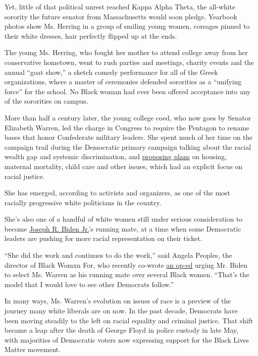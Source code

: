 Yet, little of that political unrest reached Kappa Alpha Theta, the
all-white sorority the future senator from Massachusetts would soon
pledge. Yearbook photos show Ms. Herring in a group of smiling young
women, corsages pinned to their white dresses, hair perfectly flipped up
at the ends.

The young Ms. Herring, who fought her mother to attend college away from
her conservative hometown, went to rush parties and meetings, charity
events and the annual ``goat show,'' a sketch comedy performance for all
of the Greek organizations, where a master of ceremonies defended
sororities as a ``unifying force'' for the school. No Black woman had
ever been offered acceptance into any of the sororities on campus.

More than half a century later, the young college coed, who now goes by
Senator Elizabeth Warren, led the charge in Congress to require the
Pentagon to rename bases that honor Confederate military leaders. She
spent much of her time on the campaign trail during the Democratic
primary campaign talking about the racial wealth gap and systemic
discrimination, and
\href{https://www.nytimes.com/2019/06/10/us/politics/elizabeth-warren-2020-policies-platform.html}{proposing
plans} on housing, maternal mortality, child care and other issues,
which had an explicit focus on racial justice.

She has emerged, according to activists and organizers, as one of the
most racially progressive white politicians in the country.

She's also one of a handful of white women still under serious
consideration to become
\href{https://www.nytimes.com/interactive/2020/us/elections/joe-biden.html}{Joseph
R. Biden Jr.}'s running mate, at a time when some Democratic leaders are
pushing for more racial representation on their ticket.

``She did the work and continues to do the work,'' said Angela Peoples,
the director of Black Womxn For, who recently co-wrote
\href{https://www.washingtonpost.com/outlook/2020/07/15/biden-black-women-warren-running-mate/}{an
op-ed} urging Mr. Biden to select Ms. Warren as his running mate over
several Black women. ``That's the model that I would love to see other
Democrats follow.''

In many ways, Ms. Warren's evolution on issues of race is a preview of
the journey many white liberals are on now. In the past decade,
Democrats have been moving steadily to the left on racial equality and
criminal justice. That shift became a leap after the death of George
Floyd in police custody in late May, with majorities of Democratic
voters now expressing support for the Black Lives Matter movement.

